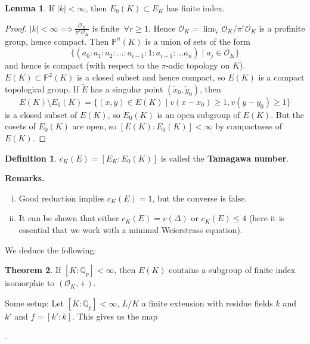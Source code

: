 \documentclass{article}
\theoremstyle{definition}
\newtheorem{theorem}{Theorem}[section]
\newtheorem{lemma}[theorem]{Lemma}
\newtheorem{defn}{Definition}[section]
\begin{document}
\begin{lemma}\label{lemma9.6}
    If $\left|k\right|<\infty$, then $E_0(K)\subset E_K$ has finite index.
\end{lemma}
\begin{proof}
    $\left|k\right|<\infty \implies \frac{\mathcal{O}_K}{\pi^r \mathcal{O}_K}$ is finite $~\forall r\ge 1$. Hence $\mathcal{O}_K = \lim_{\stackrel{\leftarrow}{r} } \mathcal{O}_K/\pi^r \mathcal{O}_K$ is a profinite group, hence compact. Then $\mathbb{P}^n(K)$ is a union of sets of the form \[
    \{(a_0:a_1:a_2:\ldots:a_{i-1}:1:a_{i+1}:\ldots a_n) \mid a_j \in \mathcal{O}_K\}
    \]
    and hence is compact (with respect to the $\pi$-adic topology on $K$). $E(K) \subset \mathbb{P}^2(K)$ is a closed subset and hence compact, so $E(K)$ is a compact topological group. If $\widetilde{E}$ has a singular point $(\widetilde{x}_0,\widetilde{y}_0)$, then \[
    E(K) \setminus E_0(K) = \{(x,y) \in E(K) \mid v(x-x_0)\ge 1,v(y-y_0)\ge 1\}
    \]
    is a closed subset of $E(K)$, so $E_0(K)$ is an open subgroup of $E(K)$. But the cosets of $E_0(K)$ are open, so $[E(K):E_0(K)]<\infty$ by compactness of $E(K)$.
\end{proof}
\begin{defn}
    $c_K(E) = [E_K:E_0(K)]$ is called the \textbf{Tamagawa number}.
\end{defn}
\textbf{Remarks.}
\begin{enumerate}[(i)]
    \item Good reduction implies $c_K(E)=1$, but the converse is false.
    \item It can be shown that either $c_K(E) = v(\Delta)$ or $c_K(E)\le 4$ (here it is essential that we work with a minimal Weierstrass equation). 
\end{enumerate} 
We deduce the following:
\begin{theorem}\label{theorem9.7}
    If $[K:\mathbb{Q}_p]<\infty$, then $E(K)$ contains a subgroup of finite index isomorphic to $(\mathcal{O}_K,+)$.
\end{theorem}
Some setup: Let $[K:\mathbb{Q}_p]<\infty$, $L/K$ a finite extension with residue fields $k$ and $k'$ and $f = [k':k]$. This gives us the map 
.
\vspace{1mm}
\end{document}
